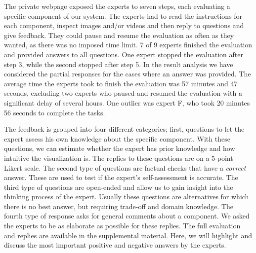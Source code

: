 \documentclass[conference,10pt,letter]{IEEEtran}
\begin{document}
The private webpage exposed the experts to seven steps, each evaluating a specific component of our system. The experts had to read the instructions for each component, inspect images and/or videos and then reply to questions and give feedback. They could pause and resume the evaluation as often as they wanted, as there was no imposed time limit. 7 of 9 experts finished the evaluation and provided answers to all questions. One expert stopped the evaluation after step 3, while the second stopped after step 5. In the result analysis we have considered the partial responses for the cases where an answer was provided. The average time the experts took to finish the evaluation was 57 minutes and 47 seconds, excluding two experts who paused and resumed the evaluation with a significant delay of several hours. One outlier was expert F, who took 20 minutes 56 seconds to complete the tasks.

The feedback is grouped into four different categories; first, questions to let the expert assess his own knowledge about the specific  component. With these questions, we can estimate whether the expert has prior knowledge and how intuitive the visualization is. The replies to these questions are on a 5-point Likert scale. The second type of questions are factual checks that have a \emph{correct} answer. These are used to test if the expert's self-assessment is accurate. The third type of questions are open-ended and allow us to gain insight into the thinking process of the expert. Usually these questions are alternatives for which there is no best answer, but requiring trade-off and domain knowledge. The fourth type of response asks for general comments about a component. We asked the experts to be as elaborate as possible for these replies. The full evaluation and replies are available in the supplemental material. Here, we will highlight and discuss the most important positive and negative answers by the experts. 
\end{document}

